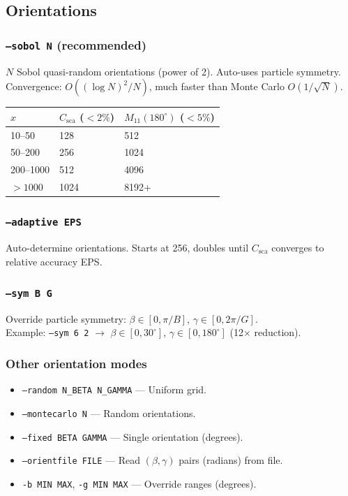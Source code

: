 \documentclass[11pt,a4paper]{article}
\begin{document}
\subsection{Orientations}

\subsubsection{\texttt{--sobol N} (recommended)}
$N$ Sobol quasi-random orientations (power of 2). Auto-uses particle symmetry.\\
Convergence: $O((\log N)^2/N)$, much faster than Monte Carlo $O(1/\sqrt{N})$.

\begin{tabular}{lll}
\toprule
$x$ & $C_\text{sca}$ ($<2\%$) & $M_{11}(180^\circ)$ ($<5\%$) \\
\midrule
10--50   & 128  & 512 \\
50--200  & 256  & 1024 \\
200--1000 & 512 & 4096 \\
$>1000$  & 1024 & 8192+ \\
\bottomrule
\end{tabular}

\subsubsection{\texttt{--adaptive EPS}}
Auto-determine orientations. Starts at 256, doubles until $C_\text{sca}$ converges to relative accuracy EPS.

\subsubsection{\texttt{--sym B G}}
Override particle symmetry: $\beta \in [0, \pi/B]$, $\gamma \in [0, 2\pi/G]$.\\
Example: \texttt{--sym 6 2} $\to$ $\beta\in[0,30^\circ]$, $\gamma\in[0,180^\circ]$ (12$\times$ reduction).

\subsubsection{Other orientation modes}
\begin{itemize}
\item \texttt{--random N\_BETA N\_GAMMA} --- Uniform grid.
\item \texttt{--montecarlo N} --- Random orientations.
\item \texttt{--fixed BETA GAMMA} --- Single orientation (degrees).
\item \texttt{--orientfile FILE} --- Read $(\beta,\gamma)$ pairs (radians) from file.
\item \texttt{-b MIN MAX}, \texttt{-g MIN MAX} --- Override ranges (degrees).
\end{itemize}
\end{document}
